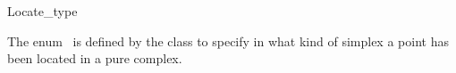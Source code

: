 \ccModifierCrossRefOff
\begin{ccRefEnum}{Locate_type}

\ccDefinition
  
The enum \ccRefName\ is defined by the class  to specify 
in what kind of simplex a point has been located in a pure complex.

{}

\ccSeeAlso


\end{ccRefEnum}
\ccModifierCrossRefOn
